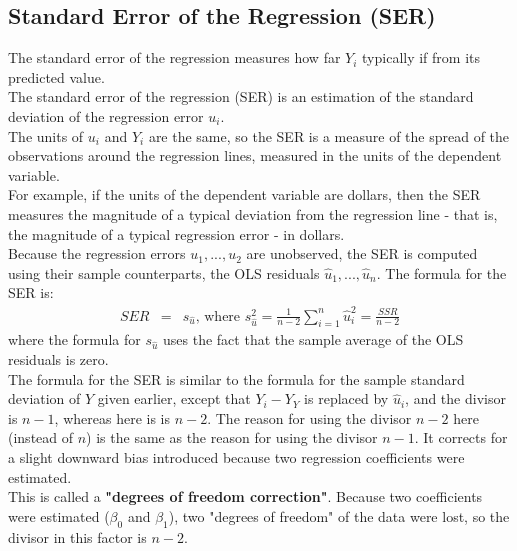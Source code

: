 \subsection{Standard Error of the Regression (SER)}
The standard error of the regression measures how far $Y_{i}$ typically if from its predicted value.\\
The standard error of the regression (SER) is an estimation of the standard deviation of the regression error $u_{i}$.\\
The units of $u_{i}$ and $Y_{i}$ are the same, so the SER is a measure of the spread of the observations around the regression lines, measured in the units of the dependent variable.\\
For example, if the units of the dependent variable are dollars, then the SER measures the magnitude of a typical deviation from the regression line - that is, the magnitude of a typical regression error - in dollars.\\
Because the regression errors $u_{1}, ..., u_{2}$ are unobserved, the SER is computed using their sample counterparts, the OLS residuals $\hat{u}_{1}, ..., \hat{u}_{n}$. The formula for the SER is:
\begin{eqnarray}
	SER  &=& s_{\hat{u}}\text{, where $s_{\hat{u}}^{2} = \frac{1}{n - 2}\sum_{i = 1}^{n}\hat{u}_{i}^{2} = \frac{SSR}{n - 2}$}
\end{eqnarray}
where the formula for $s_{\hat{u}}$ uses the fact that the sample average of the OLS residuals is zero.\\
The formula for the SER is similar to the formula for the sample standard deviation of $Y$ given earlier, except that $Y_{i} - Y_{Y}$ is replaced by $\hat{u}_{i}$, and the divisor is $n - 1$, whereas here is is $n - 2$. The reason for using the divisor $n - 2$ here (instead of $n$) is the same as the reason for using the divisor $n - 1$. It corrects for a slight downward bias introduced because two regression coefficients were estimated.\\
This is called a \textbf{\color{blue}"degrees of freedom correction"}. Because two coefficients were estimated ($\beta_{0}$ and $\beta_{1}$), two "degrees of freedom" of the data were lost, so the divisor in this factor is $n - 2$.

